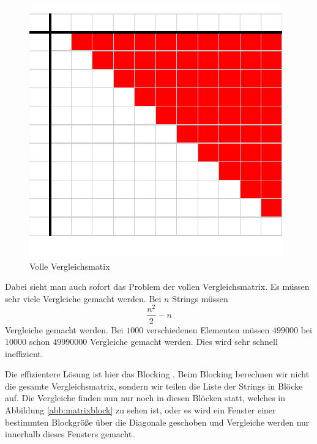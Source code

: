 \documentclass[sigconf]{acmart}
\begin{document}
\begin{figure}[htbp]
  \centering
  \includegraphics{table.pdf}
  \caption{Volle Vergleichsmatix}
  \label{abb:matrix}
\end{figure}

Dabei sieht man auch sofort das Problem der vollen Vergleichsmatrix.
Es müssen sehr viele Vergleiche gemacht werden. Bei $n$
Strings müssen
$$\frac{n^2}{2} - n$$
Vergleiche gemacht werden.
Bei $1000$ verschiedenen
Elementen müssen $499000$ bei $10000$ schon $49990000$ Vergleiche
gemacht werden. Dies wird sehr schnell ineffizient.

Die effizientere Lösung ist hier das Blocking \cite[Vlg. S. 11]{elmagarmid1}.
Beim Blocking berechnen wir nicht die gesamte
Vergleichsmatrix, sondern wir teilen die Liste der Strings
in Blöcke auf. Die Vergleiche finden nun nur noch in diesen
Blöcken statt, welches in Abbildung \ref{abb:matrixblock} zu sehen ist,
oder es wird ein Fenster einer bestimmten Blockgröße über die
Diagonale geschoben und Vergleiche werden nur innerhalb
dieses Fensters gemacht.
\end{document}
